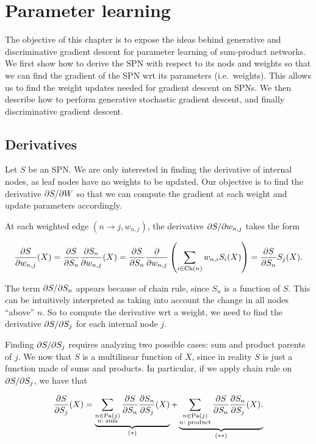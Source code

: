 \chapter{Parameter learning}\label{chp:weights}

The objective of this chapter is to expose the ideas behind generative and discriminative gradient
descent for parameter learning of sum-product networks. We first show how to derive the SPN with
respect to its nods and weights so that we can find the gradient of the SPN wrt its parameters
(i.e.\ weights). This allows us to find the weight updates needed for gradient descent on SPNs. We
then describe how to perform generative stochastic gradient descent, and finally discriminative
gradient descent.

\section{Derivatives}

Let $S$ be an SPN\@. We are only interested in finding the derivative of internal nodes, as leaf
nodes have no weights to be updated. Our objective is to find the derivative $\partial S/\partial W$ so
that we can compute the gradient at each weight and update parameters accordingly.

At each weighted edge $(n\to j, w_{n,j})$, the derivative $\partial S/\partial w_{n,j}$ takes the form

\begin{equation}
  \frac{\partial S}{\partial w_{n,j}}(X)=\frac{\partial S}{\partial S_n}\frac{\partial S_n}{\partial w_{n,j}}(X)=
    \frac{\partial S}{\partial S_n}\frac{\partial}{\partial w_{n,j}}\left(\sum_{i\in\operatorname*{\text{Ch}}(n)}w_{n,i}S_i(X)\right)=
    \frac{\partial S}{\partial S_n}S_j(X).
\end{equation}

The term $\partial S/\partial S_n$ appears because of chain rule, since $S_n$ is a function of $S$. This
can be intuitively interpreted as taking into account the change in all nodes ``above'' $n$. So to
compute the derivative wrt a weight, we need to find the derivative $\partial S/\partial S_j$ for each
internal node $j$.

Finding $\partial S/\partial S_j$ requires analyzing two possible cases: sum and product parents of $j$.
We now that $S$ is a multilinear function of $X$, since in reality $S$ is just a function made of
sums and products. In particular, if we apply chain rule on $\partial S/\partial S_j$, we have that

\begin{equation*}
  \frac{\partial S}{\partial S_j}(X)=\underbrace{\sum_{\substack{n\in\operatorname*{\text{Pa}}(j)\\n:\text{
          sum}}}\frac{\partial S}{\partial S_n}\frac{\partial S_n}{\partial S_j}(X)}_{(\ast)}+
    \underbrace{\sum_{\substack{n\in\operatorname*{\text{Pa}}(j)\\n:\text{
            product}}}\frac{\partial S}{\partial S_n}\frac{\partial S_n}{\partial S_j}(X).}_{(\ast\ast)}
\end{equation*}

